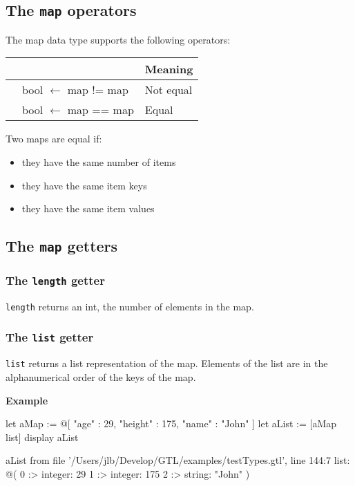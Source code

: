 \documentclass[10pt,openright,twosides,final]{memoir}
\newcommand{\gtltype}[1]{{\small\ttfamily #1}}
\newcommand{\gtlinline}[1]{\colorbox{light-blue}{\lstinline[language=gtl]{#1}}}
\newcommand{\example}{\vspace{.75em}\noindent\textbf{Example}\vspace{0em}}
\begin{document}
\subsection{The \texttt{map} operators}

The \gtltype{map} data type supports the following operators:

\begin{longtable}{>{\ttfamily}l|>{\ttfamily}l|l}
{\bfseries Operator}&{\bfseries Expression type}&{\bfseries Meaning}\\
\hline\endhead
 {!=}&
  {bool $\leftarrow$ map != map}&
  {Not equal}\\
 {==}&
  {bool $\leftarrow$ map == map}&
  {Equal}\\
\end{longtable}

Two maps are equal if:
\begin{itemize}[noitemsep]
\item they have the same number of items
\item they have the same item keys
\item they have the same item values
\end{itemize}


\subsection{The \texttt{map} getters}

\subsubsection{The \texttt{length} getter}

\gtlinline{length} returns an int, the number of elements in the map.


\subsubsection{The \texttt{list} getter}
\label{sec:listGetterOnMap}

\gtlinline{list} returns a list representation of the map. Elements of the list are in the alphanumerical order of the keys of the map.

\example
\begin{gtl}
let aMap := @[ "age" : 29, "height" : 175, "name" : "John" ]
let aList := [aMap list]
display aList
\end{gtl}
\begin{console}
aList from file '/Users/jlb/Develop/GTL/examples/testTypes.gtl', line 144:7
    list: @(
        0 :>
            integer: 29
        1 :>
            integer: 175
        2 :>
            string: "John"
    )
\end{console}
\end{document}
